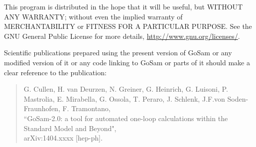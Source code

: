 \documentclass[11pt,a4paper]{refrep}
\begin{document}
    This program is distributed in the hope that it will be useful,
    but WITHOUT ANY WARRANTY; without even the implied warranty of
    MERCHANTABILITY or FITNESS FOR A PARTICULAR PURPOSE.  See the
    GNU General Public License for more details, 
    \url{http://www.gnu.org/licenses/}.

   
    Scientific publications prepared using the present version of
    GoSam or any modified version of it or any code linking to
    GoSam or parts of it should make a clear reference to the publication:

    \begin{quote}
        G. Cullen,  H. van Deurzen, N. Greiner, G. Heinrich, G. Luisoni, 
              P. Mastrolia, E. Mirabella, G. Ossola, T. Peraro, J. Schlenk, 
	      J.F.von Soden-Fraunhofen, F. Tramontano, \\
	``GoSam-2.0: a tool for automated one-loop calculations within the Standard Model and Beyond",\\
	arXiv:1404.xxxx [hep-ph].
    \end{quote}





\begin{fullpage}

\end{fullpage}

\clearpage
\remarks
\end{document}
